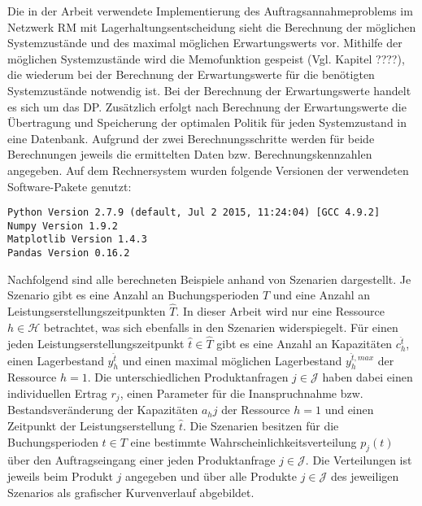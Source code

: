 Die in der Arbeit verwendete Implementierung des Auftragsannahmeproblems im Netzwerk RM mit Lagerhaltungsentscheidung sieht die Berechnung der möglichen Systemzustände und des maximal möglichen Erwartungswerts vor. Mithilfe der möglichen Systemzustände wird die Memofunktion gespeist (Vgl. Kapitel ????), die wiederum bei der Berechnung der Erwartungswerte für die benötigten Systemzustände notwendig ist. Bei der Berechnung der Erwartungswerte handelt es sich um das DP. Zusätzlich erfolgt nach Berechnung der Erwartungswerte die Übertragung und Speicherung der optimalen Politik für jeden Systemzustand in eine Datenbank. Aufgrund der zwei Berechnungsschritte werden für beide Berechnungen jeweils die ermittelten Daten bzw. Berechnungskennzahlen angegeben.  Auf dem Rechnersystem wurden folgende Versionen der verwendeten Software-Pakete genutzt:

\colorbox{hellgrau}{\parbox{14cm}{\texttt{Python Version 2.7.9 (default, Jul  2 2015, 11:24:04) [GCC 4.9.2]\\
Numpy Version 1.9.2\\
Matplotlib Version 1.4.3\\
Pandas Version 0.16.2
}}}

Nachfolgend sind alle berechneten Beispiele anhand von Szenarien dargestellt. Je Szenario gibt es eine Anzahl an Buchungsperioden $T$ und eine Anzahl an Leistungserstellungszeitpunkten $\hat T$. In dieser Arbeit wird nur eine Ressource $h\in\mathcal{H}$ betrachtet, was sich ebenfalls in den Szenarien widerspiegelt. Für einen jeden Leistungserstellungszeitpunkt $\hat t \in \hat T$ gibt es eine Anzahl an Kapazitäten $c_h^{\hat t}$, einen Lagerbestand $y_h^{\hat t}$ und einen maximal möglichen Lagerbestand $y_h^{{\hat t},max}$ der Ressource $h=1$. Die unterschiedlichen Produktanfragen $j\in\mathcal{J}$ haben dabei einen individuellen Ertrag $r_j$, einen Parameter für die Inanspruchnahme bzw. Bestandsveränderung der Kapazitäten $a_hj$ der Ressource $h=1$ und einen Zeitpunkt der Leistungserstellung $\hat t$. Die Szenarien besitzen für die Buchungsperioden $t\in T$ eine bestimmte Wahrscheinlichkeitsverteilung $p_j(t)$ über den Auftragseingang einer jeden Produktanfrage $j\in\mathcal{J}$. Die Verteilungen ist jeweils beim Produkt $j$ angegeben und über alle Produkte $j\in\mathcal{J}$ des jeweiligen Szenarios als grafischer Kurvenverlauf abgebildet.

